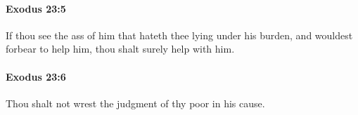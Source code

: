 		\paragraph{Exodus 23:5} %
			\label{EXODUS-23-5}

			If thou see the ass of him that hateth thee lying under his burden, and wouldest forbear to help him, thou shalt surely help with him.


		\paragraph{Exodus 23:6} %
			\label{EXODUS-23-6}

			Thou shalt not wrest the judgment of thy poor in his cause.


